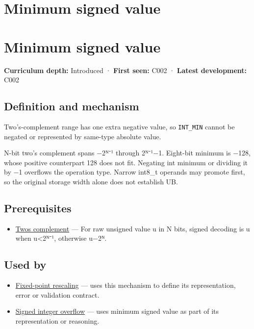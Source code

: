 \hypertarget{appendix-05f39b10364d}{}
\section*{Minimum signed value}
\section{Minimum signed value}\label{minimum-signed-value}

\textbf{Curriculum depth:} Introduced · \textbf{First seen:} C002 · \textbf{Latest development:} C002

\subsection{Definition and mechanism}\label{definition-and-mechanism}

Two's-complement range has one extra negative value, so \texttt{INT\_MIN} cannot be negated or represented by same-type absolute value.

N-bit two's complement spans −2ᴺ⁻¹ through 2ᴺ⁻¹−1. Eight-bit minimum is −128, whose positive counterpart 128 does not fit. Negating int minimum or dividing it by −1 overflows the operation type. Narrow int8\_t operands may promote first, so the original storage width alone does not establish UB.

\subsection{Prerequisites}\label{prerequisites}

\begin{itemize}
\tightlist
\item
  \hyperref[appendix-4fbc03d20829]{Two\textquotesingle s complement} --- For raw unsigned value u in N bits, signed decoding is u when u\textless2ᴺ⁻¹, otherwise u−2ᴺ.
\end{itemize}

\subsection{Used by}\label{used-by}

\begin{itemize}
\item
  \hyperref[appendix-3333db47830f]{Fixed-point rescaling} --- uses this mechanism to define its representation, error or validation contract.
\item
  \hyperref[appendix-1a599c924a4e]{Signed integer overflow} --- uses minimum signed value as part of its representation or reasoning.
\end{itemize}

